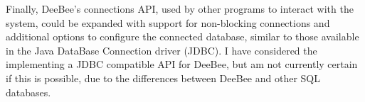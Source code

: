 Finally, DeeBee's connections API, used by other programs to interact with the system, could be expanded with support for non-blocking connections and additional options to configure the connected database, similar to those available in the Java DataBase Connection driver (JDBC). I have considered the implementing a JDBC compatible API for DeeBee, but am not currently certain if this is possible, due to the differences between DeeBee and other SQL databases.
\pagebreak
{}


